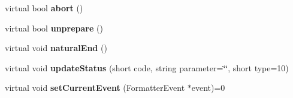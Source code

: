 \begin{CompactItemize}
\item 
virtual bool \textbf{abort} ()\label{classbr_1_1pucrio_1_1telemidia_1_1ginga_1_1ncl_1_1adapters_1_1remote_1_1RemotePlayerAdapter_fd9013d2c3c1e4507a6ba5bb5cdac9f6}

\item 
virtual bool \textbf{unprepare} ()\label{classbr_1_1pucrio_1_1telemidia_1_1ginga_1_1ncl_1_1adapters_1_1remote_1_1RemotePlayerAdapter_e7bf99c1347e02aa34a54ed2e1d00865}

\item 
virtual void \textbf{naturalEnd} ()\label{classbr_1_1pucrio_1_1telemidia_1_1ginga_1_1ncl_1_1adapters_1_1remote_1_1RemotePlayerAdapter_0e08b713f0740e1881952f0cc8c307fe}

\item 
virtual void \textbf{updateStatus} (short code, string parameter=\char`\"{}\char`\"{}, short type=10)\label{classbr_1_1pucrio_1_1telemidia_1_1ginga_1_1ncl_1_1adapters_1_1remote_1_1RemotePlayerAdapter_c03f218bb250bf9c4176bd75a5fee484}

\item 
virtual void \textbf{setCurrentEvent} (FormatterEvent $\ast$event)=0\label{classbr_1_1pucrio_1_1telemidia_1_1ginga_1_1ncl_1_1adapters_1_1remote_1_1RemotePlayerAdapter_9792359635112024365e4d17ff7ae5a0}

\end{CompactItemize}
